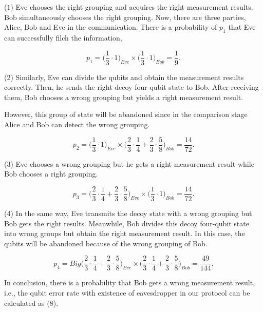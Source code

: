 \documentclass[a4paper,11pt]{article}
\begin{document}
($1$) Eve chooses the right grouping and acquires the right measurement results. Bob simultaneously chooses the right grouping. Now, there are three parties, Alice, Bob and Eve
in the communication. There is a probability of $p_1$ that Eve can successfully filch the information,

\begin{equation*}
 p_1 = \Big(\dfrac{1}{3} \cdot 1 \Big)_{Eve} \times  \Big(\dfrac{1}{3} \cdot 1 \Big)_{Bob} = \dfrac{1}{9}.
\end{equation*}

(2) Similarly, Eve can divide the qubits and obtain the measurement results correctly. Then, he sends the right decoy four-qubit state to Bob. After receiving them, Bob chooses a wrong grouping but yields a right measurement result.

However, this group of state will be abandoned since in the comparison stage Alice and Bob can detect the wrong grouping.

\begin{equation*}
p_2 = \Big(\dfrac{1}{3}\cdot 1 \Big)_{Eve} \times \Big(\dfrac{2}{3}\cdot \dfrac{1}{4} + 
\dfrac{2}{3} \cdot \dfrac{5}{8} \Big)_{Bob} = \dfrac{14}{72}.
\end{equation*}

(3) Eve chooses a wrong grouping but he gets a right measurement result while Bob chooses a right grouping.

\begin{equation*}
p_3 = \Big(\dfrac{2}{3}\cdot \dfrac{1}{4} + 
\dfrac{2}{3} \cdot \dfrac{5}{8} \Big)_{Eve} \times \Big( \dfrac{1}{3}\cdot 1 \Big)_{Bob} = \dfrac{14}{72}.
\end{equation*}

(4) In the same way, Eve transmits the decoy state with a wrong grouping but Bob gets the right results. Meanwhile, Bob divides this decoy four-qubit state into wrong groups but
obtain the right measurement result. In this case, the qubits will be abandoned because of the wrong grouping of Bob.

\begin{equation*}
p_4 = Big(\dfrac{2}{3}\cdot \dfrac{1}{4} + 
\dfrac{2}{3} \cdot \dfrac{5}{8} \Big)_{Eve} \times \Big(\dfrac{2}{3}\cdot \dfrac{1}{4} + 
\dfrac{2}{3} \cdot \dfrac{5}{8} \Big)_{Bob} = \dfrac{49}{144}.
\end{equation*}

In conclusion, there is a probability that Bob gets a wrong measurement result, i.e., the qubit error rate with existence of eavesdropper in our protocol can be calculated as (8).
\end{document}
